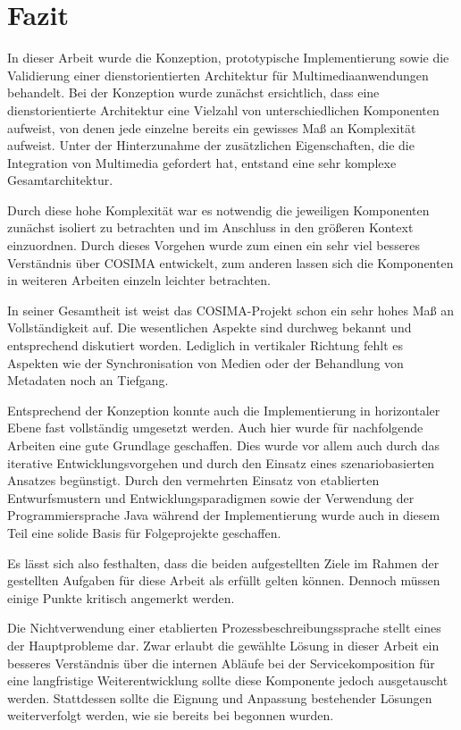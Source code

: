 \chapter{Fazit} %
\label{cha:fazit}

  In dieser Arbeit wurde die Konzeption, prototypische Implementierung sowie die Validierung einer dienstorientierten Architektur für Multimediaanwendungen behandelt. Bei der Konzeption wurde zunächst ersichtlich, dass eine dienstorientierte Architektur eine Vielzahl von unterschiedlichen Komponenten aufweist, von denen jede einzelne bereits ein gewisses Maß an Komplexität aufweist. Unter der Hinterzunahme der zusätzlichen Eigenschaften, die die Integration von Multimedia gefordert hat, entstand eine sehr komplexe Gesamtarchitektur.
  
  Durch diese hohe Komplexität war es notwendig die jeweiligen Komponenten zunächst isoliert zu betrachten und im Anschluss in den größeren Kontext einzuordnen. Durch dieses Vorgehen wurde zum einen ein sehr viel besseres Verständnis über COSIMA entwickelt, zum anderen lassen sich die Komponenten in weiteren Arbeiten einzeln leichter betrachten.
  
  In seiner Gesamtheit ist weist das COSIMA-Projekt schon ein sehr hohes Maß an Vollständigkeit auf. Die wesentlichen Aspekte sind durchweg bekannt und entsprechend diskutiert worden. Lediglich in vertikaler Richtung fehlt es Aspekten wie der Synchronisation von Medien oder der Behandlung von Metadaten noch an Tiefgang.
  
  Entsprechend der Konzeption konnte auch die Implementierung in horizontaler Ebene fast vollständig umgesetzt werden. Auch hier wurde für nachfolgende Arbeiten eine gute Grundlage geschaffen. Dies wurde vor allem auch durch das iterative Entwicklungsvorgehen und durch den Einsatz eines szenariobasierten Ansatzes begünstigt. Durch den vermehrten Einsatz von etablierten Entwurfsmustern und Entwicklungsparadigmen sowie der Verwendung der Programmiersprache Java während der Implementierung wurde auch in diesem Teil eine solide Basis für Folgeprojekte geschaffen.
  
  Es lässt sich also festhalten, dass die beiden aufgestellten Ziele im Rahmen der gestellten Aufgaben für diese Arbeit als erfüllt gelten können. Dennoch müssen einige Punkte kritisch angemerkt werden.
  
  Die Nichtverwendung einer etablierten Prozessbeschreibungssprache stellt eines der Hauptprobleme dar. Zwar erlaubt die gewählte Lösung in dieser Arbeit ein besseres Verständnis über die internen Abläufe bei der Servicekomposition für eine langfristige Weiterentwicklung sollte diese Komponente jedoch ausgetauscht werden. Stattdessen sollte die Eignung und Anpassung bestehender Lösungen weiterverfolgt werden, wie sie bereits bei \citep{samma08} begonnen wurden.
  
